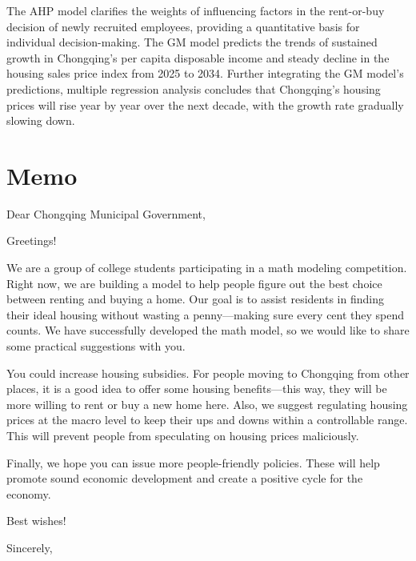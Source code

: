 \documentclass{mcmthesis}
\begin{document}
The AHP model clarifies the weights of influencing factors in the rent-or-buy decision of newly recruited employees, 
providing a quantitative basis for individual decision-making. 
The GM model predicts the trends of sustained growth in Chongqing's per capita disposable income and steady decline 
in the housing sales price index from 2025 to 2034. Further integrating the GM model's predictions, 
multiple regression analysis concludes that Chongqing's housing prices will rise year by year over the next decade, 
with the growth rate gradually slowing down.



\section*{Memo}
Dear Chongqing Municipal Government,

Greetings!

We are a group of college students participating in a math modeling competition. 
Right now, we are building a model to help people figure out the best choice between renting and buying a home. 
Our goal is to assist residents in finding their ideal housing without wasting a penny—making sure every cent they 
spend counts. We have successfully developed the math model, so we would like to share some practical suggestions with you.

You could increase housing subsidies. For people moving to Chongqing from other places, 
it is a good idea to offer some housing benefits—this way, 
they will be more willing to rent or buy a new home here.
Also, we suggest regulating housing prices at the macro level to keep their ups and downs within a controllable range. 
This will prevent people from speculating on housing prices maliciously.

Finally, we hope you can issue more people-friendly policies. These will help promote sound economic development and create a positive cycle for the economy.


Best wishes!

Sincerely,
\end{document}
